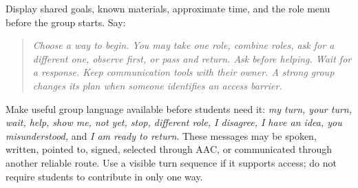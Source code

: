 \normalsize


Display shared goals, known materials, approximate time, and the role menu before the group starts. Say:

\begin{quote}
\textit{Choose a way to begin. You may take one role, combine roles, ask for a different one, observe first, or pass and return. Ask before helping. Wait for a response. Keep communication tools with their owner. A strong group changes its plan when someone identifies an access barrier.}
\end{quote}

Make useful group language available before students need it: \textit{my turn, your turn, wait, help, show me, not yet, stop, different role, I disagree, I have an idea, you misunderstood,} and \textit{I am ready to return}. These messages may be spoken, written, pointed to, signed, selected through AAC, or communicated through another reliable route. Use a visible turn sequence if it supports access; do not require students to contribute in only one way.

{}

\renewcommand{\arraystretch}{1.0}
\setlength{\tabcolsep}{3pt}

